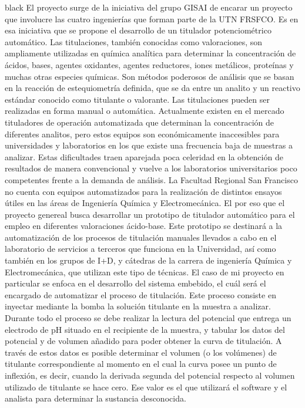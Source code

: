 \documentclass[11pt]{charter}
\begin{document}
\begin{consigna}{black}
El proyecto surge de la iniciativa del grupo GISAI de encarar un proyecto que involucre las cuatro ingenierías que forman parte de la UTN FRSFCO. Es en esa iniciativa que se propone el desarrollo de un titulador potenciométrico automático. Las titulaciones, también conocidas como valoraciones, son ampliamente utilizadas en química analítica para determinar la concentración de ácidos, bases, agentes oxidantes, agentes reductores, iones metálicos, proteínas y muchas otras especies químicas. Son métodos poderosos de análisis que se basan en la reacción de estequiometría definida, que se da entre un analito y un reactivo estándar conocido como titulante o valorante. Las titulaciones pueden ser realizadas en forma manual o automática. Actualmente existen en el mercado tituladores de operación automatizada que determinan la concentración de diferentes analitos, pero estos equipos son económicamente inaccesibles para universidades y laboratorios en los que existe una frecuencia baja de muestras a analizar. Estas dificultades traen aparejada poca celeridad en la obtención de resultados de manera convencional y vuelve a los laboratorios universitarios poco competentes frente a la demanda de análisis. La Facultad Regional San Francisco no cuenta con equipos automatizados para la realización de distintos ensayos útiles en las áreas de Ingeniería Química y Electromecánica. El por eso que el proyecto genereal busca desarrollar un prototipo de titulador automático para el empleo en diferentes valoraciones ácido-base. Este prototipo se destinará a la automatización de los procesos de titulación manuales llevados a cabo en el laboratorio de servicios a terceros que funciona en la Universidad, así como también en los grupos de I+D, y cátedras de la carrera de ingeniería Química y Electromecánica, que utilizan este tipo de técnicas.
El caso de mi proyecto en particular se enfoca en el desarrollo del sistema embebido, el cuál será el encargado de automatizar el proceso de titulación. Este proceso consiste en inyectar mediante la bomba la solución titulante en la muestra a analizar. Durante todo el proceso se debe realizar la lectura del potencial que entrega un electrodo de pH situado en el recipiente de la muestra, y tabular los datos del potencial y de volumen añadido para poder obtener la curva de titulación. A través de estos datos es posible determinar el volumen (o los volúmenes) de titulante correspondiente al momento en el cual la curva posee un punto de inflexión, es decir, cuando la derivada segunda del potencial respecto al volumen utilizado de titulante se hace cero. Ese valor es el que utilizará el software y el analista para determinar la sustancia desconocida.


\end{consigna}
\end{document}

